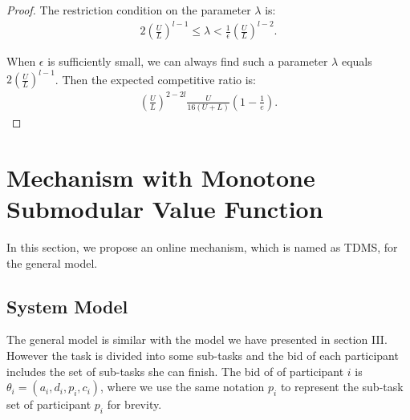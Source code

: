 \documentclass[conference,compsocconf,letterpaper,10pt]{IEEEtran}
\begin{document}
\begin{proof}
The restriction condition on the parameter $\lambda$ is:
\begin{align}
2\left(\frac{U}{L}\right)^{l-1}\le\lambda < \frac{1}{\epsilon}\left(\frac{U}{L}\right)^{l-2}.
\end{align}

When $\epsilon$ is sufficiently small, we can always find such a parameter $\lambda$ equals $2\left(\frac{U}{L}\right)^{l-1}$. Then the expected competitive ratio is:
\begin{align}
\left(\frac{U}{L}\right)^{2-2l}\frac{U}{16(U+L)}(1-\frac{1}{e}). 
\end{align}
\end{proof}
\section{Mechanism with Monotone Submodular Value Function}
In this section, we propose an online mechanism, which is named as TDMS, for the general model.
\subsection{System Model}
The general model is similar with the model we have presented in section III. However the task is divided into some sub-tasks and the bid of each participant includes the set of sub-tasks she can finish. The bid of of participant $i$ is $\theta_i=(a_i,d_i,p_i,c_i)$, where we use the same notation $p_i$ to represent the sub-task set of participant $p_i$ for brevity.
\end{document}
